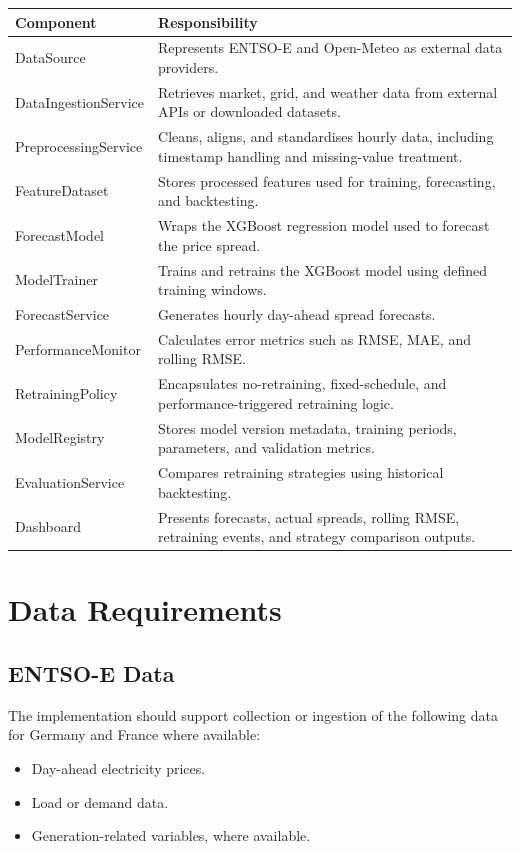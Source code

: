 \documentclass[12pt,a4paper]{article}
\begin{document}
\begin{longtable}{p{} p{}}
\hline
\textbf{Component} & \textbf{Responsibility} \\
\hline
DataSource & Represents ENTSO-E and Open-Meteo as external data providers. \\
DataIngestionService & Retrieves market, grid, and weather data from external APIs or downloaded datasets. \\
PreprocessingService & Cleans, aligns, and standardises hourly data, including timestamp handling and missing-value treatment. \\
FeatureDataset & Stores processed features used for training, forecasting, and backtesting. \\
ForecastModel & Wraps the XGBoost regression model used to forecast the price spread. \\
ModelTrainer & Trains and retrains the XGBoost model using defined training windows. \\
ForecastService & Generates hourly day-ahead spread forecasts. \\
PerformanceMonitor & Calculates error metrics such as RMSE, MAE, and rolling RMSE. \\
RetrainingPolicy & Encapsulates no-retraining, fixed-schedule, and performance-triggered retraining logic. \\
ModelRegistry & Stores model version metadata, training periods, parameters, and validation metrics. \\
EvaluationService & Compares retraining strategies using historical backtesting. \\
Dashboard & Presents forecasts, actual spreads, rolling RMSE, retraining events, and strategy comparison outputs. \\
\hline
\end{longtable}

\section{Data Requirements}

\subsection{ENTSO-E Data}

The implementation should support collection or ingestion of the following data for Germany and France where available:

\begin{itemize}
    \item Day-ahead electricity prices.
    \item Load or demand data.
    \item Generation-related variables, where available.
\end{itemize}
\end{document}
